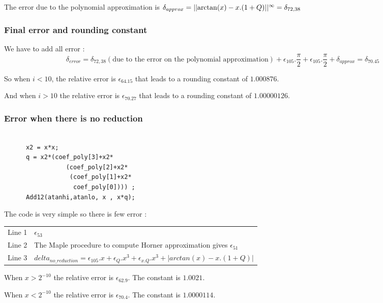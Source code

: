 The error due to the polynomial approximation is $\delta_{approx} =
||{ \arctan(x) - x.(1+Q)}||^{\infty}= \delta_{72,38}$ 

\subsubsection {Final error and rounding constant}

We have to add all error : 
\begin{equation}
\delta_{error} = \delta_{72,38} (\text{due to the error on the polynomial
approximation}) + \epsilon_{105}.\frac{\pi}{2} +
\epsilon_{105}.\frac{\pi}{2} + \delta_{approx} = \delta_{70.45}
\end{equation}

So when $i < 10$, the relative error is $\epsilon_{64.15}$ that leads to a
rounding constant of $1.000876$.

And when $i > 10$ the relative error is $\epsilon_{70.27}$ that leads to a
rounding constant of $1.00000126$.

\subsubsection{Error when there is no reduction}
\begin{lstlisting}[caption={No reduction},firstnumber=1]

      x2 = x*x;
      q = x2*(coef_poly[3]+x2*
                 (coef_poly[2]+x2*
                  (coef_poly[1]+x2*
                   coef_poly[0]))) ;
      Add12(atanhi,atanlo, x , x*q);

\end{lstlisting}

The code is very simple so there is few error :

\begin{tabular}{ll}
Line 1 & $\epsilon_{53}$ \\
Line 2 & The Maple procedure to compute Horner approximation gives $\epsilon_{51}$\\
Line 3 & $delta_{no\_reduction} = \epsilon_{105}.x + \epsilon_Q.x^3 + 
\epsilon_{x.Q}.x^3 + |arctan(x) - x.(1+Q)| $
\end{tabular}

When $x>2^{-10}$ the relative error is $\epsilon_{62.9}$. The
constant is $1.0021$. 

When $x<2^{-10}$ the relative error is $\epsilon_{70.4}$. The
constant is $1.0000114$. 

\bigskip

